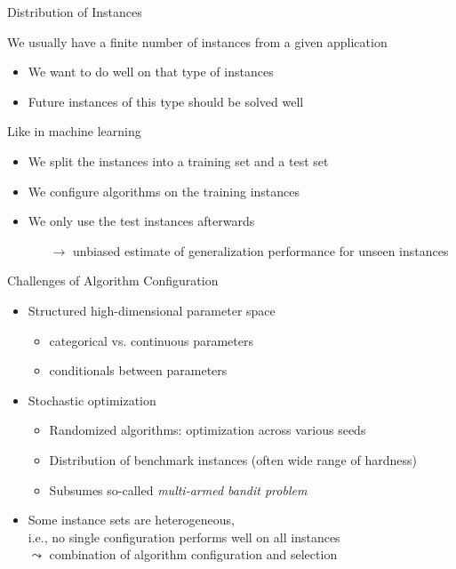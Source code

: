 \begin{frame}[c]{Distribution of Instances}

We usually have a finite number of instances from a given application
\begin{itemize}
\item We want to do well on that type of instances
\item Future instances of this type should be solved well 
\end{itemize}

\pause
\bigskip

Like in machine learning
\begin{itemize}
\item We split the instances into a \alert{training set} and a \alert{test set}
\item We configure algorithms on the training instances
\item We only use the test instances afterwards
\begin{itemize}
\item[$\to$] unbiased estimate of generalization performance for unseen instances
\end{itemize}  
\end{itemize}


\end{frame}
\begin{frame}[c]{Challenges of Algorithm Configuration}

\begin{itemize}
\item \alert{Structured high-dimensional parameter space}
\begin{itemize}
\item categorical vs. continuous parameters
\item conditionals between parameters
\end{itemize}
\pause
\medskip
\item \alert{Stochastic optimization}
\begin{itemize}
\item Randomized algorithms: optimization across various seeds
\item Distribution of benchmark instances (often wide range of hardness)
\item Subsumes so-called \emph{multi-armed bandit problem}
\end{itemize}
\pause
\medskip
\item Some instance sets are \alert{heterogeneous},\\i.e., no single configuration performs well on all instances\\ 
$\leadsto$ combination of algorithm configuration and selection
\end{itemize}

\end{frame}


